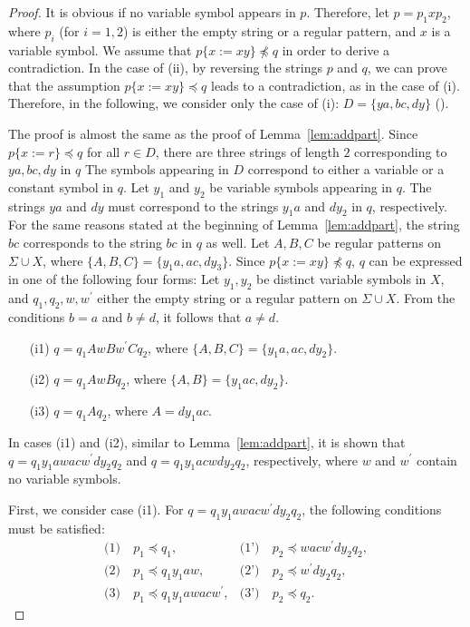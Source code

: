 \begin{proof}
It is obvious if no variable symbol appears in $p$.
Therefore, let $p=p_{1}xp_{2}$, where $p_{i}$ (for $i=1,2$) is either the empty string or a regular pattern, and $x$ is a variable symbol.
We assume that $p \{ x := xy \} \not \preceq q$ in order to derive a contradiction.
In the case of \textrm{(ii)}, by reversing the strings $p$ and $q$, we can prove that the assumption $p \{ x := xy \} \preceq q$ leads to a contradiction, as in the case of \textrm{(i)}.
Therefore, in the following, we consider only the case of \textrm{(i)}: $D=\{ ya, bc, dy \}$ (\TheConditionB).

The proof is almost the same as the proof of Lemma~\ref{lem:addpart}.
Since $p \{ x := r \} \preceq q$ for all $r \in D$, there are three strings of length $2$ corresponding to $ya, bc, dy$ in $q$
The symbols appearing in $D$ correspond to either a variable or a constant symbol in $q$.
Let $y_{1}$ and $y_{2}$ be variable symbols appearing in $q$.
The strings $ya$ and $dy$ must correspond to the strings $y_{1}a$ and $dy_{2}$ in $q$, respectively.
For the same reasons stated at the beginning of Lemma~\ref{lem:addpart}, the string $bc$ corresponds to the string $bc$ in $q$ as well.
Let $A,B,C$ be regular patterns on $\Sigma \cup X$, where $\{ A,B,C \} = \{ y_{1}a,ac,dy_{3} \}$.
Since $p \{ x := xy \} \not \preceq q$, $q$ can be expressed in one of the following four forms:
Let $y_{1}, y_{2}$ be distinct variable symbols in $X$, and $q_{1}, q_{2}, w, w^{\prime}$ either the empty string or a regular pattern on $\Sigma\cup X$.
From the conditions $b = a$ and $b \not= d$, it follows that $a \not= d$.
\begin{enumerate}
\item[(i1)] $q=q_{1}AwBw^{\prime}Cq_{2}$, where $\{ A,B,C \} = \{ y_{1}a,ac,dy_{2} \}$.
\item[(i2)] $q=q_{1}AwBq_{2}$, where $\{ A,B \} = \{ y_{1}ac,dy_{2} \}$.
\item[(i3)] $q=q_{1}Aq_{2}$, where $A = dy_{1}ac$.
\end{enumerate}

In cases (i1) and (i2), similar to Lemma~\ref{lem:addpart}, it is shown that $q=q_{1}y_{1}awacw^{\prime}dy_{2}q_{2}$ and $q=q_{1}y_{1}acwdy_{2}q_{2}$, respectively, where $w$ and $w^{\prime}$ contain no variable symbols.

First, we consider case (i1).
For $q=q_{1}y_{1}awacw^{\prime}dy_{2}q_{2}$, the following conditions must be satisfied:
\begin{align*}
  \textrm{(1)}~& p_{1} \preceq q_{1}, & \textrm{(1')}~& p_{2} \preceq wacw^{\prime}dy_{2}q_{2}, \\
  \textrm{(2)}~& p_{1} \preceq q_{1}y_{1}aw, & \textrm{(2')}~& p_{2} \preceq w^{\prime}dy_{2}q_{2}, \\
  \textrm{(3)}~& p_{1} \preceq q_{1}y_{1}awacw^{\prime}, & \textrm{(3')}~& p_{2} \preceq q_{2}.
\end{align*}


\end{proof}
